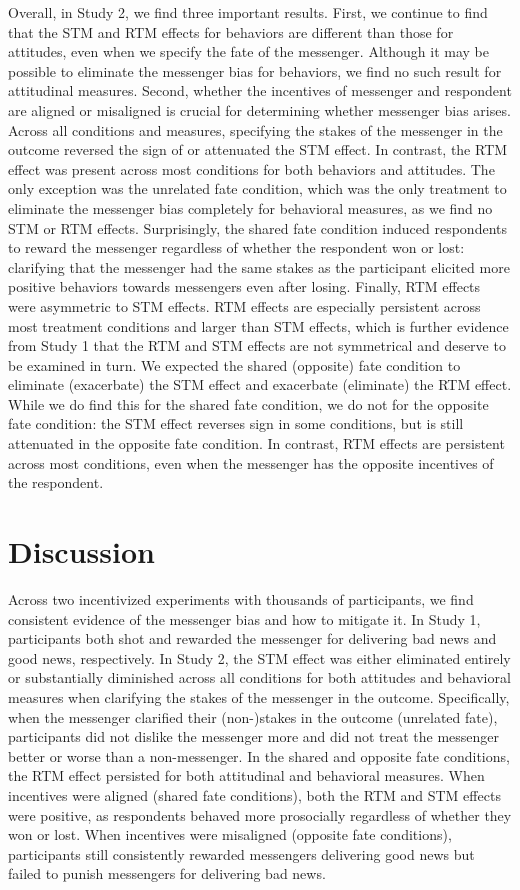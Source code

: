Overall, in Study 2, we find three important results. First, we continue
to find that the STM and RTM effects for behaviors are different than
those for attitudes, even when we specify the fate of the messenger.
Although it may be possible to eliminate the messenger bias for
behaviors, we find no such result for attitudinal measures. Second,
whether the incentives of messenger and respondent are aligned or
misaligned is crucial for determining whether messenger bias arises.
Across all conditions and measures, specifying the stakes of the
messenger in the outcome reversed the sign of or attenuated the STM
effect. In contrast, the RTM effect was present across most conditions
for both behaviors and attitudes. The only exception was the unrelated
fate condition, which was the only treatment to eliminate the messenger
bias completely
for behavioral measures, as we find no STM or RTM effects. Surprisingly,
the shared fate condition induced respondents to reward the messenger regardless of whether
the respondent won or lost: clarifying that the messenger had the same
stakes as the participant elicited more positive behaviors towards
messengers even after losing. Finally, RTM effects were asymmetric to
STM effects. RTM effects are especially persistent across most treatment
conditions and larger than STM effects, which is further evidence from
Study 1 that the RTM and STM effects are not symmetrical and deserve to
be examined in turn. We expected the shared (opposite) fate condition to
eliminate (exacerbate) the STM effect and exacerbate (eliminate) the RTM
effect. While we do find this for the shared fate condition, we do not for the opposite fate condition: the STM effect reverses sign in some
conditions, but is still attenuated in the opposite fate condition. In contrast, RTM
effects are persistent across most conditions, even when the messenger has the
opposite incentives of the respondent.

\section{Discussion}

Across two incentivized experiments with thousands of participants, we
find consistent evidence of the messenger bias and how to mitigate it.
In Study 1, participants both shot and rewarded the messenger for
delivering bad news and good news, respectively. In Study 2, the
STM effect was either eliminated entirely or substantially diminished
across all conditions for both attitudes and behavioral measures when
clarifying the stakes of the messenger in the outcome. Specifically,
when the messenger clarified their (non-)stakes in the outcome
(unrelated fate), participants did not dislike the messenger more and
did not treat the messenger better or worse than a non-messenger. In the
shared and opposite fate conditions, the RTM effect persisted for both
attitudinal and behavioral measures. When incentives were aligned
(shared fate conditions), both the RTM and STM effects were positive, as
respondents behaved more prosocially regardless of whether they won or
lost. When incentives were misaligned (opposite fate conditions),
participants still consistently rewarded messengers delivering good
news but failed to punish messengers for delivering bad news.

